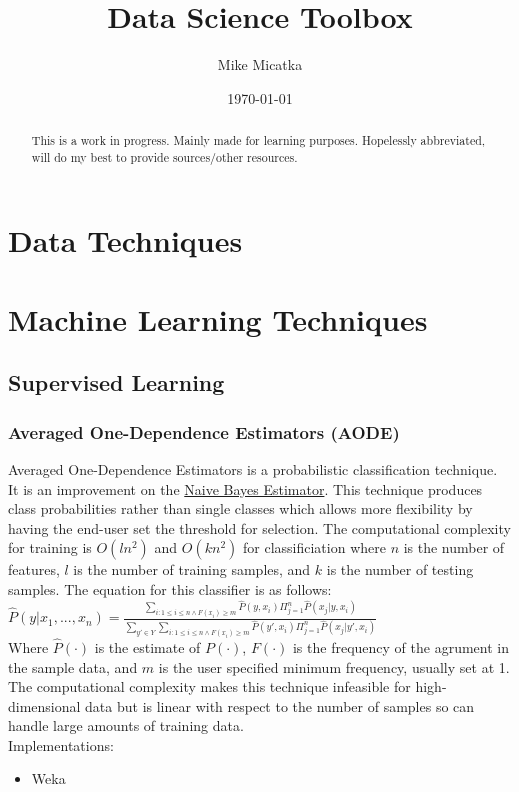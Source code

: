 \documentclass{report}
\title{Data Science Toolbox}
\author{
	Mike Micatka
}
\date{\today}
\begin{document}
\maketitle

\tableofcontents

\renewcommand{\abstractname}{What is Data Science?}
\begin{abstract}
This is a work in progress. Mainly made for learning purposes. Hopelessly 
abbreviated, will do my best to provide sources/other resources.
\end{abstract}

\chapter{Data Techniques}

\chapter{Machine Learning Techniques}
\section{Supervised Learning}
	\subsection{Averaged One-Dependence Estimators (AODE)}
Averaged One-Dependence Estimators is a probabilistic classification technique. It is an improvement on the \hyperref[subsec:bayesian_statistics]{Naive Bayes Estimator}. This technique produces class probabilities rather than single classes which allows more flexibility by having the end-user set the threshold for selection. The computational complexity for training is $O(ln^2)$ and $O(kn^2)$ for classificiation where $n$ is the number of features, $l$ is the number of training samples, and $k$ is the number of testing samples. The equation for this classifier is as follows:\\
$
\hat{P}(y|x_1, ..., x_n) = \frac{
\sum_{i:1 \leq i \leq n \wedge F(x_i) \geq m} \hat{P}(y,x_i) \Pi ^n _{j=1} \hat{P}(x_j | y, x_i)
}
{
\sum_{y'\in Y} \sum _{i:1 \leq i \leq n \wedge F(x_i) \geq m} \hat{P}(y',x_i) \Pi ^n _{j=1} \hat{P} (x_j | y', x_i)
}
$\\
Where $\hat{P}(\cdot)$ is the estimate of $P(\cdot)$, $F(\cdot)$ is the frequency of the agrument in the sample data, and $m$ is the user specified minimum frequency, usually set at 1.\\
The computational complexity makes this technique infeasible for high-dimensional data but is linear with respect to the number of samples so can handle large amounts of training data. 
\\
Implementations:
\begin{itemize}
\item Weka
\end{itemize}
\end{document}
